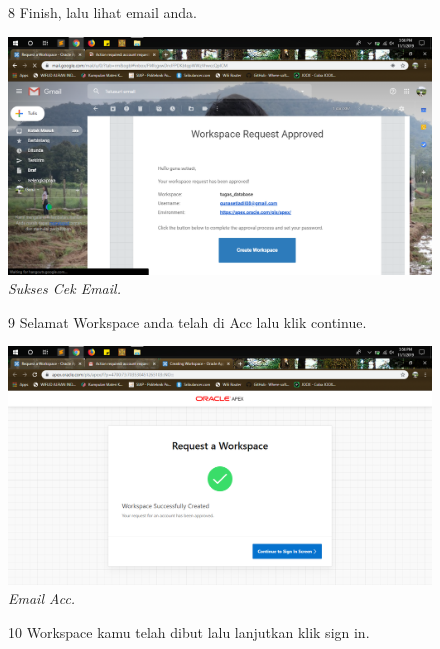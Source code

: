 \begin{enumerate}
\begin{figure}
\item[8] Finish, lalu lihat email anda.

    \begin{center}
\includegraphics[scale=0.2]{figures/g6.png}
    \caption{\textit{Sukses Cek Email.}}
        \end{center}
\label{gambar}
\end{figure}

\begin{figure}
\item[9] Selamat Workspace anda telah di Acc lalu klik continue.

    \begin{center}
\includegraphics[scale=0.2]{figures/g7.png}
    \caption{\textit{Email Acc.}}
        \end{center}
\label{gambar}
\end{figure}

\begin{figure}
\item[10] Workspace kamu telah dibut lalu lanjutkan klik sign in.


\end{figure}
\end{enumerate}
